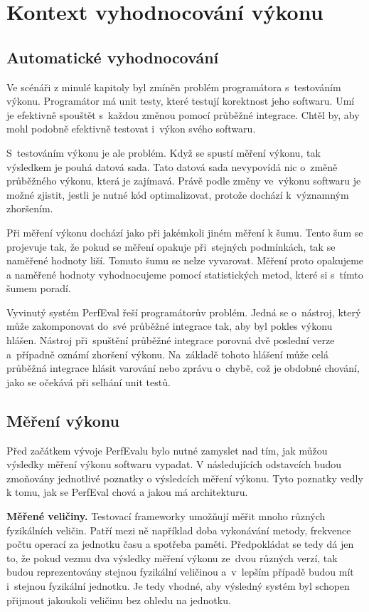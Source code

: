 \chapter{Kontext vyhodnocování výkonu}

\section{Automatické vyhodnocování}
Ve scénáři z minulé kapitoly byl zmíněn problém programátora s~testováním výkonu. Programátor má unit
testy, které testují korektnost jeho softwaru. Umí je efektivně spouštět s~každou změnou
pomocí průběžné integrace. Chtěl by, aby mohl podobně efektivně testovat i~výkon svého softwaru.

S~testováním výkonu je ale problém. Když se spustí měření výkonu, tak výsledkem je pouhá
datová sada. Tato datová sada nevypovídá nic o~změně průběžného výkonu, která
je zajímavá. Právě podle změny ve~výkonu softwaru je možné zjistit, jestli je nutné
kód optimalizovat, protože dochází k~významným zhoršením.

Při měření výkonu dochází jako při jakémkoli jiném měření k šumu. Tento šum se projevuje
tak, že pokud se měření opakuje při~stejných podmínkách, tak se naměřené hodnoty liší.
Tomuto šumu se nelze vyvarovat. Měření proto opakujeme a naměřené hodnoty vyhodnocujeme
pomocí statistických metod, které si s~tímto šumem poradí.

Vyvinutý systém PerfEval řeší programátorův problém. Jedná se o~nástroj, který může
zakomponovat do~své průběžné integrace tak, aby byl pokles výkonu hlášen. Nástroj
při~spuštění průběžné integrace porovná dvě poslední verze a~případně oznámí zhoršení výkonu.
Na~základě tohoto hlášení může celá průběžná integrace hlásit varování nebo zprávu o~chybě, což je obdobné chování,
jako se očekává při selhání unit testů.

\section{Měření výkonu}

Před začátkem vývoje PerfEvalu bylo nutné zamyslet nad tím, jak můžou výsledky měření výkonu softwaru vypadat.
V následujících odstavcích budou zmoňovány jednotlivé poznatky o výsledcích měření výkonu.
Tyto poznatky vedly k tomu, jak se PerfEval chová a jakou má architekturu.

\bigskip
\noindent\textbf{Měřené veličiny.} Testovací frameworky umožňují měřit mnoho různých fyzikálních veličin. Patří mezi ně například
doba vykonávání metody, frekvence počtu operací za jednotku času a spotřeba paměti.
Předpokládat se tedy dá jen to, že pokud vezmu dva výsledky měření výkonu ze~dvou různých
verzí, tak budou reprezentovány stejnou fyzikální veličinou a~v~lepším případě budou mít
i~stejnou fyzikální jednotku. Je tedy vhodné, aby výsledný systém byl schopen přijmout
jakoukoli veličinu bez ohledu na jednotku.

